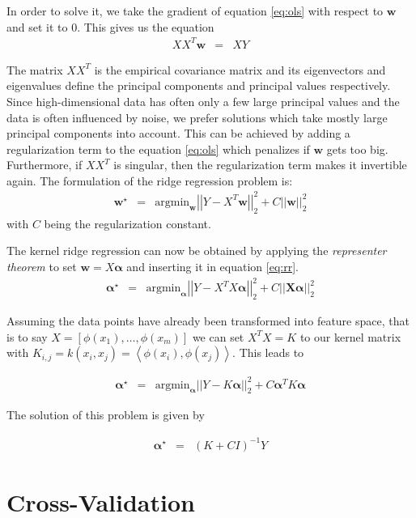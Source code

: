 \documentclass[a4paper, 11pt, titlepage]{article}
\newcommand{\norm}[1]{\left|\left|#1\right|\right|}
\newcommand{\argmin}{\text{argmin}}
\begin{document}
In order to solve it, we take the gradient of equation \eqref{eq:ols} with respect to $\mathbf{w}$ and set it to $0$.
This gives us the equation
\begin{eqnarray*}
	XX^T\mathbf{w} &=& XY
\end{eqnarray*}

The matrix $XX^T$ is the empirical covariance matrix and its eigenvectors and eigenvalues define the principal components and principal values respectively.
Since high-dimensional data has often only a few large principal values and the data is often influenced by noise, we prefer solutions which take mostly large principal components into account.
This can be achieved by adding a regularization term to the equation \eqref{eq:ols} which penalizes if $\mathbf{w}$ gets too big.
Furthermore, if $XX^T$ is singular, then the regularization term makes it invertible again.
The formulation of the ridge regression problem is:
\begin{eqnarray*}
	\mathbf{w}^\star &=& \argmin_{\mathbf{w}} \norm{Y - X^T\mathbf{w}}^2_2 + C\norm{\mathbf{w}}_2^2 \label{eq:rr}
\end{eqnarray*}
with $C$ being the regularization constant.

The kernel ridge regression can now be obtained by applying the \emph{representer theorem} to set $\mathbf{w}=X\mathbf{\alpha}$ and inserting it in equation \eqref{eq:rr}.
\begin{eqnarray*}
	\mathbf{\alpha}^\star &=& \argmin_{\mathbf{\alpha}} \norm{Y - X^TX\mathbf{\alpha}}^2_2 + C\norm{\mathbf{X\alpha}}_2^2
\end{eqnarray*}

Assuming the data points have already been transformed into feature space, that is to say $X=\left[\phi(x_1),\ldots,\phi(x_m)\right]$ we can set $X^TX=K$ to our kernel matrix with $K_{i,j} = k(x_i,x_j) = \left \langle \phi(x_i),\phi(x_j)\right \rangle$. This leads to

\begin{eqnarray*}
	\mathbf{\alpha}^\star &=& \argmin_{\mathbf{\alpha}} \norm{Y-K\mathbf{\alpha}}^2_2 + C \mathbf{\alpha}^TK\mathbf{\alpha}
\end{eqnarray*}

The solution of this problem is given by

\begin{eqnarray*}
	\mathbf{\alpha}^\star &=& (K+CI)^{-1}Y
\end{eqnarray*}

\section{Cross-Validation}
\end{document}
